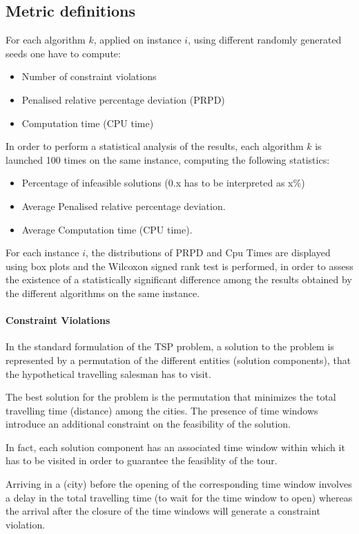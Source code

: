 \begin{homeworkProblem}
\subsection{Metric definitions}\label{subsec:metric}
For each algorithm $k$, applied on instance $i$, using different randomly generated seeds one have to compute:
\begin{itemize}
  \item Number of constraint violations
  \item Penalised relative percentage deviation (PRPD)
  \item Computation time (CPU time)
\end{itemize}

In order to perform a statistical analysis of the results, each algorithm $k$ is launched 100 times on the same instance, computing the
following statistics:
\begin{itemize}
  \item Percentage of infeasible solutions (0.x has to be interpreted as x\%) 
  \item Average Penalised relative percentage deviation.
  \item Average Computation time (CPU time).
\end{itemize}

For each instance $i$, the distributions of PRPD and Cpu Times are displayed using box plots and the Wilcoxon signed rank test is performed, in order to assess the existence of a statistically significant difference among the results obtained by the different algorithms on the same instance. 

\paragraph{Constraint Violations}
In the standard formulation of the TSP problem, a solution to the problem is represented by a permutation of the different
entities (solution components), that the hypothetical travelling salesman has to visit.

The best solution for the problem is the permutation that minimizes the total travelling time (distance) among the cities.
The presence of time windows introduce an additional constraint on the feasibility of the solution.

In fact, each solution component has an associated time window within which it has to be visited in order to guarantee the feasiblity of the tour.

Arriving in a (city) before the opening of the corresponding time window involves a delay in the total travelling time (to wait for the time window to open) whereas the arrival after the closure of the time windows will generate a constraint violation.


\end{homeworkProblem}

